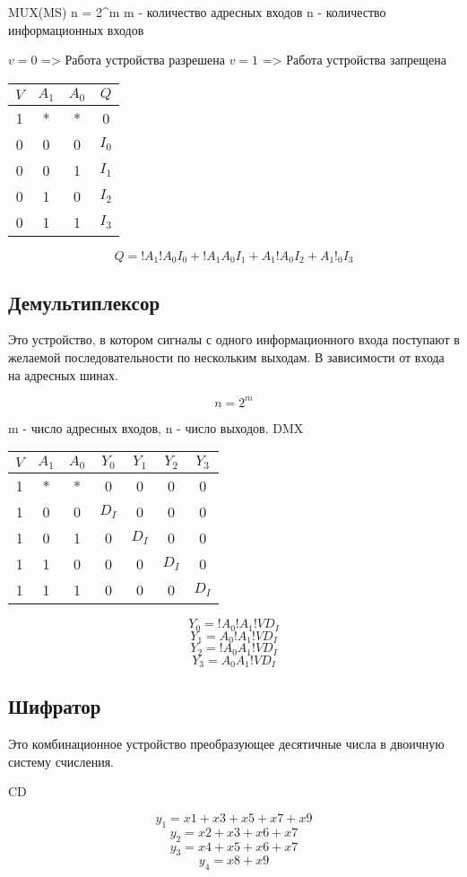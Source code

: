 \documentclass[a4paper]{article}
\begin{document}
MUX(MS)
n = 2^m
m - количество адресных входов
n - количество информационных входов

$ v = 0 $ => Работа устройства разрешена
$ v = 1 $ => Работа устройства запрещена

\begin{table}[ht]
\centering
\begin{tabular}{|c|c|c|c|}
\hline
$V$ & $A_1$ & $A_0$ & $Q$ \\
\hline
1 & * & * & 0 \\
0 & 0 & 0 & $I_0$ \\
0 & 0 & 1 & $I_1$ \\
0 & 1 & 0 & $I_2$ \\
0 & 1 & 1 & $I_3$ \\
\hline
\end{tabular}
\end{table}

$$Q = !A_1!A_0I_0 + !A_1A_0I_1 + A_1!A_0I_2 + A_1!_0I_3$$

\subsection{Демультиплексор}
Это устройство, в котором сигналы с одного информационного входа поступают в желаемой последовательности по нескольким выходам. В зависимости от входа на адресных шинах.

$$ n = 2^m $$

m - число адресных входов, n - число выходов.
DMX

\begin{table}[ht]
\centering
\begin{tabular}{|c|c|c|c|c|c|c|}
\hline
$V$ & $A_1$ & $A_0$ & $Y_0$ & $Y_1$ & $Y_2$ & $Y_3$\\
\hline
1 & * & * & 0 & 0 & 0 & 0 \\
1 & 0 & 0 & $D_I$ & 0 & 0 & 0 \\
1 & 0 & 1 & 0 & $D_I$ & 0 & 0 \\
1 & 1 & 0 & 0 & 0 & $D_I$ & 0 \\
1 & 1 & 1 & 0 & 0 & 0 & $D_I$ \\
\hline
\end{tabular}
\end{table}
    
$$ Y_0 = !A_0!A_1!VD_I $$
$$ Y_1 = A_0!A_1!VD_I $$
$$ Y_2 = !A_0A_1!VD_I $$
$$ Y_3 = A_0A_1!VD_I $$

\subsection{Шифратор}
Это комбинационное устройство преобразующее десятичные числа в двоичную систему счисления.

CD

$$ y_1 = x1 + x3 + x5 + x7 + x9 $$
$$ y_2 = x2 + x3 + x6 + x7 $$
$$ y_3 = x4 + x5 + x6 + x7 $$
$$ y_4 = x8 + x9 $$
\end{document}
